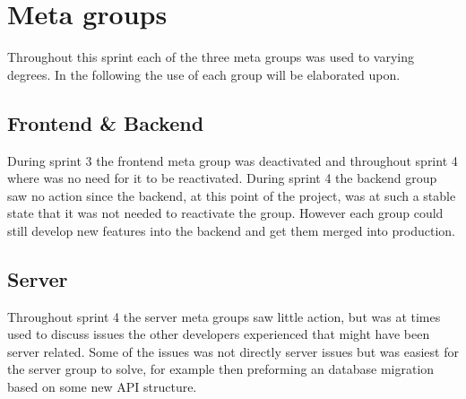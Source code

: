 \section{Meta groups}
Throughout this sprint each of the three meta groups was used to varying degrees. In the following the use of each group will be elaborated upon. 
 
\subsection{Frontend \& Backend}
During sprint 3 the frontend meta group was deactivated and throughout sprint 4 where was no need for it to be reactivated. 
During sprint 4 the backend group saw no action since the backend, at this point of the project, was at such a stable state that it was not needed to reactivate the group.
However each group could still develop new features into the backend and get them merged into production. 

\subsection{Server}
Throughout sprint 4 the server meta groups saw little action, but was at times used to discuss issues the other developers experienced that might have been server related. 
Some of the issues was not directly server issues but was easiest for the server group to solve, for example then preforming an database migration based on some new API structure.



